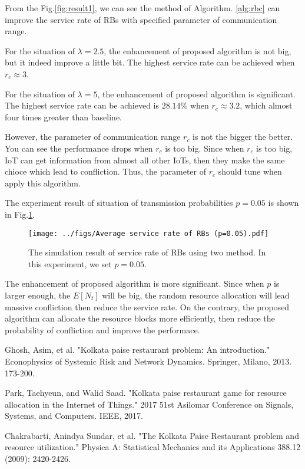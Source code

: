\documentclass[runningheads]{llncs}
\begin{document}
From the Fig.\ref{fig:result1}, we can see the method of Algorithm. \ref{alg:rbc} can improve the service rate of RBs with specified parameter of 
communication range. 

For the situation of $\lambda=2.5$, the enhancement of proposed algorithm is not big, but it indeed improve a little bit. 
The highest service rate can be achieved when $r_c\approx3$.

For the situation of $\lambda=5$, the enhancement of proposed algorithm is significant.
The highest service rate can be achieved is $28.14\%$ when $r_c\approx3.2$, which almost four times greater than baseline.

However, the parameter of communication range $r_c$ is not the bigger the better. 
You can see the performance drops when $r_c$ is too big. 
Since when $r_c$ is too big, IoT can get information from almost all other IoTs, then they make the same chioce which lead to confliction.
Thus, the parameter of $r_c$ should tune when apply this algorithm.

The experiment result of situation of transmission probabilities $p=0.05$ is shown in Fig.\ref{fig:result2}.

\begin{figure}
    \centering
    \texttt{[image: ../figs/Average service rate of RBs (p=0.05).pdf]}
    \caption{The simulation result of service rate of RBs using two method. In this experiment, we set $p=0.05$.} 
    \label{fig:result2}
\end{figure}

The enhancement of proposed algorithm is more significant.
Since when $p$ is larger enough, the $E[N_t]$ will be big, 
the random resource allocation will lead massive confliction then reduce the service rate.
On the contrary, the proposed algorithm can allocate the resource blocks more efficiently, 
then reduce the probability of confliction and improve the performace.

\newpage
\begin{thebibliography}{8}
    Ghosh, Asim, et al. "Kolkata paise restaurant problem: An introduction." Econophysics of Systemic Risk and Network Dynamics. Springer, Milano, 2013. 173-200.

    Park, Taehyeun, and Walid Saad. "Kolkata paise restaurant game for resource allocation in the Internet of Things." 2017 51st Asilomar Conference on Signals, Systems, and Computers. IEEE, 2017.

    Chakrabarti, Anindya Sundar, et al. "The Kolkata Paise Restaurant problem and resource utilization." Physica A: Statistical Mechanics and its Applications 388.12 (2009): 2420-2426.
\end{thebibliography}
\end{document}
